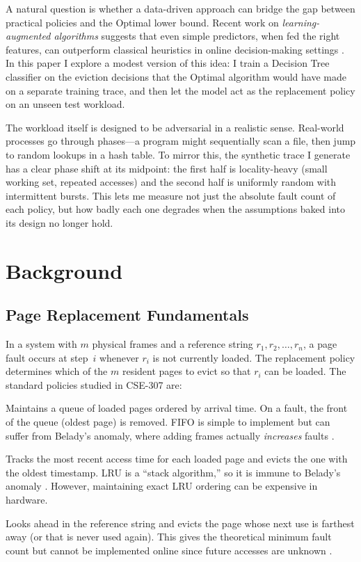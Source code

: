 \documentclass[11pt, a4paper]{article}
\begin{document}
A natural question is whether a data-driven approach can bridge the gap between practical policies and the Optimal lower bound.
Recent work on \emph{learning-augmented algorithms} suggests that even simple predictors, when fed the right features, can outperform classical heuristics in online decision-making settings \cite{lykouris2021}.
In this paper I explore a modest version of this idea: I train a Decision Tree classifier on the eviction decisions that the Optimal algorithm would have made on a separate training trace, and then let the model act as the replacement policy on an unseen test workload.

The workload itself is designed to be adversarial in a realistic sense.
Real-world processes go through phases---a program might sequentially scan a file, then jump to random lookups in a hash table.
To mirror this, the synthetic trace I generate has a clear phase shift at its midpoint: the first half is locality-heavy (small working set, repeated accesses) and the second half is uniformly random with intermittent bursts.
This lets me measure not just the absolute fault count of each policy, but how badly each one degrades when the assumptions baked into its design no longer hold.


\section{Background}
\label{sec:background}

\subsection{Page Replacement Fundamentals}

In a system with $m$ physical frames and a reference string $r_1, r_2, \ldots, r_n$, a page fault occurs at step~$i$ whenever $r_i$ is not currently loaded.
The replacement policy determines which of the $m$ resident pages to evict so that $r_i$ can be loaded.
The standard policies studied in CSE-307 are:

\begin{description}[style=nextline]
    \item[FIFO] Maintains a queue of loaded pages ordered by arrival time. On a fault, the front of the queue (oldest page) is removed. FIFO is simple to implement but can suffer from Belady's anomaly, where adding frames actually \emph{increases} faults \cite{belady1969}.
    \item[LRU] Tracks the most recent access time for each loaded page and evicts the one with the oldest timestamp. LRU is a ``stack algorithm,'' so it is immune to Belady's anomaly \cite{silberschatz2018}. However, maintaining exact LRU ordering can be expensive in hardware.
    \item[Optimal (Belady's)] Looks ahead in the reference string and evicts the page whose next use is farthest away (or that is never used again). This gives the theoretical minimum fault count but cannot be implemented online since future accesses are unknown \cite{belady1966}.
\end{description}
\end{document}
